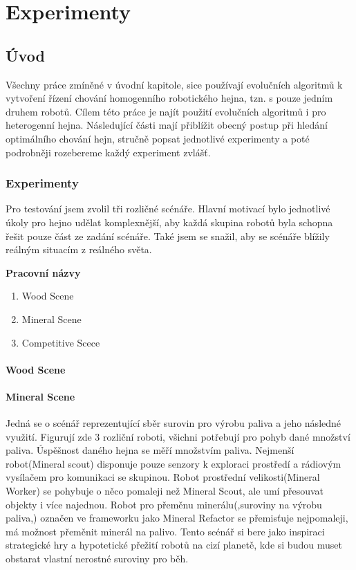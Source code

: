 \chapter{Experimenty}
\section{Úvod}
Všechny práce zmíněné v úvodní kapitole, sice používají evolučních algoritmů k vytvoření řízení chování homogenního robotického hejna, tzn. s pouze jedním druhem robotů. Cílem této práce je najít použití evolučních algoritmů i pro heterogenní hejna. Následující části mají přiblížit obecný postup při hledání optimálního chování hejn, stručně popsat jednotlivé experimenty a poté podrobněji rozebereme každý  experiment zvlášť.
\par 
\subsection{Experimenty}
Pro testování jsem zvolil tři rozličné scénáře. Hlavní motivací bylo jednotlivé úkoly pro hejno udělat komplexnější, aby každá skupina robotů byla schopna řešit pouze část ze zadání scénáře. Také jsem se snažil, aby se scénáře blížily reálným situacím z reálného světa.\par 
\textbf{Pracovní názvy}
\begin{enumerate}
	\item Wood Scene
	\item Mineral Scene
	\item Competitive Scece
\end{enumerate}
\subsubsection{Wood Scene}

\subsubsection{Mineral Scene}
Jedná se o scénář reprezentující sběr surovin pro výrobu paliva a jeho následné využití. Figurují zde 3 rozliční roboti, všichni potřebují pro pohyb  dané množství paliva. Úspěšnost daného hejna se měří množstvím paliva. Nejmenší robot(Mineral scout) disponuje pouze senzory k exploraci prostředí a rádiovým vysílačem pro komunikaci se skupinou. Robot prostřední velikosti(Mineral Worker) se pohybuje o něco pomaleji než Mineral Scout, ale umí přesouvat objekty i více najednou. Robot pro přeměnu minerálu(,suroviny na výrobu paliva,) označen ve frameworku jako Mineral Refactor se přemisťuje nejpomaleji, má možnost přeměnit minerál na palivo. Tento scénář si bere jako inspiraci strategické hry a hypotetické přežití robotů na cizí planetě, kde si budou muset obstarat vlastní 
nerostné suroviny pro běh.


